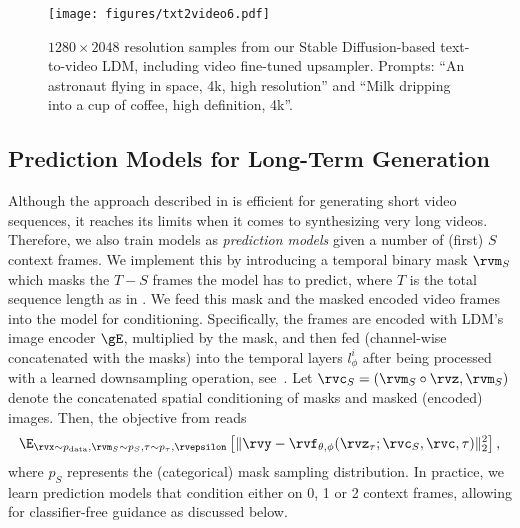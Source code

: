 \begin{figure*}[t!]
  \vspace{-0.8cm}
    \texttt{[image: figures/txt2video6.pdf]}
    \vspace{-8mm}
    \caption{\small $1280\times 2048$ resolution samples from our Stable Diffusion-based text-to-video LDM, including video fine-tuned upsampler. Prompts: ``An astronaut flying in space, 4k, high resolution''  and ``Milk dripping into a cup of coffee, high definition, 4k''.} \vspace{-0.5em}
    \label{fig:text2image_samples}
  \vspace{-4mm}
\end{figure*}\subsection{Prediction Models for Long-Term Generation}
\label{sec:prediction}
Although the approach described in  is efficient for generating short video sequences, it reaches its limits when it comes to synthesizing very long videos. Therefore, we also train models as \emph{prediction models} given a number of (first) $S$ context frames. We implement this by introducing a temporal binary mask $\rvm_S$ 
which masks the $T-S$ frames the model has to predict, where $T$ is the total sequence length as in . We feed this mask and the masked encoded video frames into the model for conditioning.
Specifically, the frames are encoded with LDM's image encoder $\gE$, multiplied by the mask, and then fed (channel-wise concatenated with the masks) into the temporal layers $l_\phi^i$ after being processed with a learned downsampling operation, see~. Let $\rvc_S = (\rvm_S \circ \rvz, \rvm_S)$ denote the concatenated spatial conditioning of masks and masked (encoded) images. Then, the objective from  reads
\begin{align}
\E_{\rvx \sim p_{\text{data}}, \rvm_S\sim p_S, \tau \sim p_{\tau}, \rvepsilon} \left[\Vert \rvy - \rvf_{\theta, \phi}(\rvz_\tau; \rvc_S, \rvc, \tau) \Vert_2^2 \right],
\label{eq:predictionobjective}
\end{align}
where $p_S$ represents the (categorical) mask sampling distribution.
In practice, we learn prediction models that condition either on 0, 1 or 2 context frames, allowing for classifier-free guidance as discussed below.

